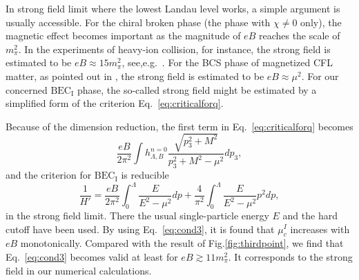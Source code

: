 \documentclass[prd, showpacs,nofootinbib,amsmath,amssymb,12pt]{revtex4}
\begin{document}
In strong field limit where the lowest Landau level works, a simple argument is usually accessible.
For the chiral broken phase (the phase with $\chi \neq 0$ only), 
the magnetic effect becomes important as the magnitude of $eB$ reaches the scale of $m_\pi^2$.
In the experiments of heavy-ion collision, for instance, the strong field is estimated to be 
$eB \approx 15 m_\pi^2$, see,e.g.~\cite{V2009ESTIMATE}.
For the BCS phase of magnetized CFL matter, as pointed out in \cite{ferrer2005magnetic},
the strong field is estimated to be $eB \approx \mu^2$.
For our concerned $\text{BEC}_\text{I}$ phase, the so-called strong field might be estimated by a simplified form of the criterion Eq.~\eqref{eq:criticalforq}.

Because of the dimension reduction,
the first term in Eq.~\eqref{eq:criticalforq} becomes
\begin{equation}\label{eq:cond2}
 \frac{eB}{ 2\pi^2} \int h_{\Lambda,B}^{n=0}
\frac{ \sqrt{p_3^2 + M^2}}{p_3^2 + M^2 - \mu^2} dp_3,
\end{equation}
and the criterion for $\text{BEC}_\text{I}$ is reducible 
\begin{equation}\label{eq:cond3}
  \frac{1}{H'} =  \frac{eB}{2\pi^2} \int^\Lambda_0\frac{E}{E^2-\mu^2}dp
  +\frac{4}{\pi^2}\int^\Lambda_0 \frac{E}{E^2-\mu^2} p^2 dp,
\end{equation}
in the strong field limit. There the usual single-particle energy $E$ and the hard cutoff have been used.
By using Eq.~\eqref{eq:cond3}, it is found that $\mu^{I}_c$ increases with $eB$ monotonically. Compared with the result of Fig.\ref{fig:thirdpoint}, we find that Eq.~\eqref{eq:cond3} becomes valid at least for $eB \gtrsim 11 m_\pi^2$. It corresponds to the strong field in our numerical calculations.
\end{document}
